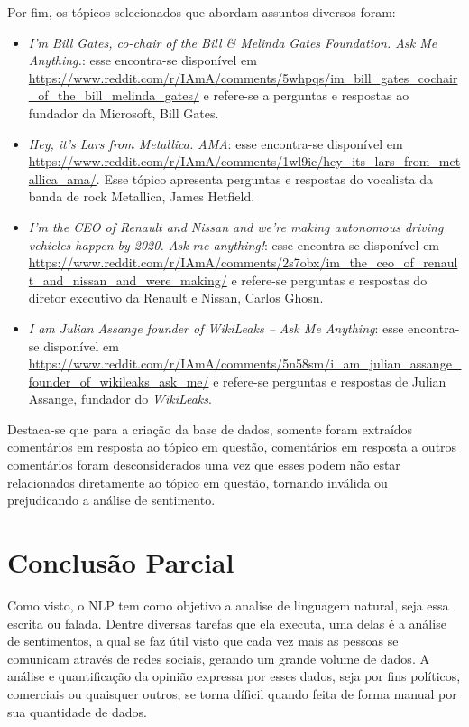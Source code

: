Por fim, os tópicos selecionados que abordam assuntos diversos foram:
\begin{itemize}
  \item
  \textit{I’m Bill Gates, co-chair of the Bill \& Melinda Gates Foundation. Ask
  Me Anything.}: esse encontra-se disponível em
  \url{https://www.reddit.com/r/IAmA/comments/5whpqs/im_bill_gates_cochair_of_the_bill_melinda_gates/}
  e refere-se a perguntas e respostas ao fundador da Microsoft, Bill Gates.
  \item
  \textit{Hey, it's Lars from Metallica. AMA}: esse encontra-se disponível em
  \url{https://www.reddit.com/r/IAmA/comments/1wl9ic/hey_its_lars_from_metallica_ama/}.
  Esse tópico apresenta perguntas e respostas do vocalista da banda de rock
  Metallica, James Hetfield.
  \item
  \textit{I'm the CEO of Renault and Nissan and we're making autonomous driving
  vehicles happen by 2020. Ask me anything!}: esse encontra-se disponível em
  \url{https://www.reddit.com/r/IAmA/comments/2s7obx/im_the_ceo_of_renault_and_nissan_and_were_making/}
  e refere-se perguntas e respostas do diretor executivo da Renault e Nissan,
  Carlos Ghosn.
  
  \item
  \textit{I am Julian Assange founder of WikiLeaks -- Ask Me Anything}: esse
  encontra-se disponível em
  \url{https://www.reddit.com/r/IAmA/comments/5n58sm/i_am_julian_assange_founder_of_wikileaks_ask_me/}
  e refere-se perguntas e respostas de Julian Assange, fundador do
  \textit{WikiLeaks}.
  
\end{itemize}


Destaca-se que para a criação da base de dados, somente foram extraídos
comentários em resposta ao tópico em questão, comentários em resposta a outros
comentários foram desconsiderados uma vez que esses podem não estar relacionados
diretamente ao tópico em questão, tornando inválida ou prejudicando a
análise de sentimento.


\chapter{Conclusão Parcial}
\label{cap:conclusao}
Como visto, o \ac{NLP} tem como objetivo a analise de linguagem natural, seja
essa escrita ou falada. Dentre diversas tarefas que ela executa, uma delas é a
análise de sentimentos, a qual se faz útil visto que cada vez
mais as pessoas se comunicam através de redes sociais, gerando um grande volume
de dados. A análise e quantificação da opinião expressa por esses dados, seja
por fins políticos, comerciais ou quaisquer outros, se torna díficil quando
feita de forma manual por sua quantidade de dados.

